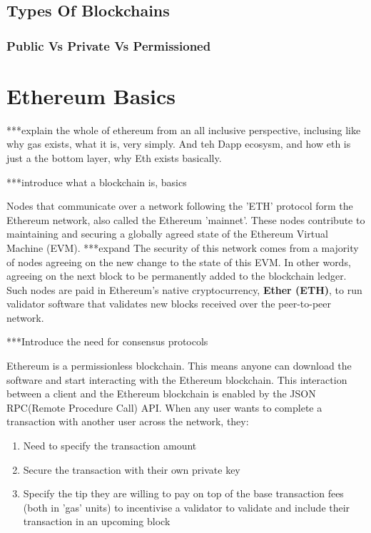 \subsection{Types Of Blockchains}




\subsubsection{Public Vs Private Vs Permissioned}



\section{Ethereum Basics}

***explain the whole of ethereum from an all inclusive perspective, inclusing like why gas exists, what it is, very simply. And teh Dapp ecosysm, and how eth is just a the bottom layer, why Eth exists basically.

***introduce what a blockchain is, basics

Nodes that communicate over a network following the 'ETH' protocol form the Ethereum network, also called the Ethereum 'mainnet'. These nodes contribute to maintaining and securing a globally agreed state of the Ethereum Virtual Machine (EVM). ***expand
The security of this network comes from a majority of nodes agreeing on the new change to the state of this EVM. In other words, agreeing on the next block to be permanently added to the blockchain ledger. Such nodes are paid in Ethereum's native cryptocurrency, \textbf{Ether (ETH)}, to run validator software that validates new blocks received over the peer-to-peer network.

***Introduce the need for consensus protocols

Ethereum is a permissionless blockchain. This means anyone can download the software and start interacting with the Ethereum blockchain. This interaction between a client and the Ethereum blockchain is enabled by the JSON RPC(Remote Procedure Call) API. When any user wants to complete a transaction with another user across the network, they:
\begin{enumerate}
    \item Need to specify the transaction amount
    \item Secure the transaction with their own private key
    \item Specify the tip they are willing to pay on top of the base transaction fees (both in 'gas' units) to incentivise a validator to validate and include their transaction in an upcoming block
\end{enumerate}

